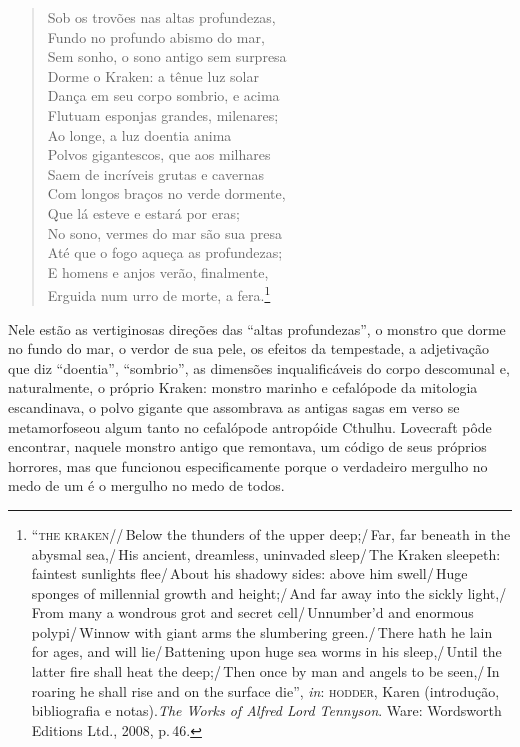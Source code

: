 \begin{quote}\noindent
Sob os trovões nas altas profundezas,\\
Fundo no profundo abismo do mar,\\
Sem sonho, o sono antigo sem surpresa\\
Dorme o Kraken: a tênue luz solar\\
Dança em seu corpo sombrio, e acima\\
Flutuam esponjas grandes, milenares;\\
Ao longe, a luz doentia anima\\
Polvos gigantescos, que aos milhares\\
Saem de incríveis grutas e cavernas\\
Com longos braços no verde dormente,\\
Que lá esteve e estará por eras;\\
No sono, vermes do mar são sua presa\\
Até que o fogo aqueça as profundezas;\\
E homens e anjos verão, finalmente,\\
Erguida num urro de morte, a fera.\footnote{``\textsc{the kraken}//\,Below the
  thunders of the upper deep;/\,Far, far beneath in the abysmal sea,/\,His
  ancient, dreamless, uninvaded sleep/\,The Kraken sleepeth: faintest
  sunlights flee/\,About his shadowy sides: above him swell/\,Huge sponges
  of millennial growth and height;/\,And far away into the sickly
  light,/\,From many a wondrous grot and secret cell/\,Unnumber'd and
  enormous polypi/\,Winnow with giant arms the slumbering green./\,There
  hath he lain for ages, and will lie/\,Battening upon huge sea worms in
  his sleep,/\,Until the latter fire shall heat the deep;/\,Then once by man
  and angels to be seen,/\,In roaring he shall rise and on the surface
  die'', \emph{in}: \textsc{hodder}, Karen (introdução, bibliografia e notas).\emph{The Works of Alfred Lord Tennyson}. Ware: Wordsworth
  Editions Ltd., 2008, p.\,46.}
\end{quote}

Nele estão as vertiginosas direções das ``altas profundezas'', o monstro
que dorme no fundo do mar, o verdor de sua pele, os efeitos da
tempestade, a adjetivação que diz ``doentia'', ``sombrio'', as dimensões
inqualificáveis do corpo descomunal e, naturalmente, o próprio Kraken:
monstro marinho e cefalópode da mitologia escandinava, o polvo gigante
que assombrava as antigas sagas em verso se metamorfoseou algum tanto no
cefalópode antropóide Cthulhu. Lovecraft pôde encontrar, naquele monstro
antigo que remontava, um código de seus próprios horrores, mas que
funcionou especificamente porque o verdadeiro mergulho no medo de um é o
mergulho no medo de todos.


